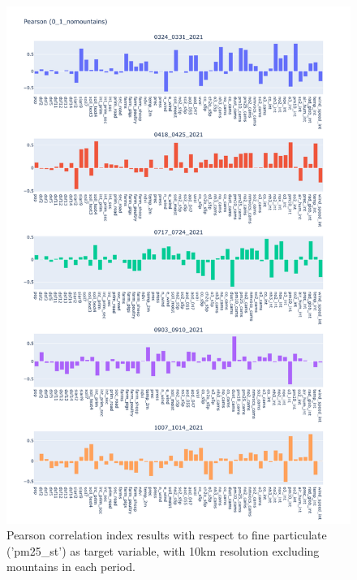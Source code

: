 \begin{figure}[H]
    \centering
    \includegraphics[scale=0.38]{images/tests/0_1_nomountainspm25_st_pearson.png}
    \caption{Pearson correlation index results with respect to fine particulate ('pm25\_st') as target variable, with 10km resolution excluding mountains in each period.}
    
\end{figure}
